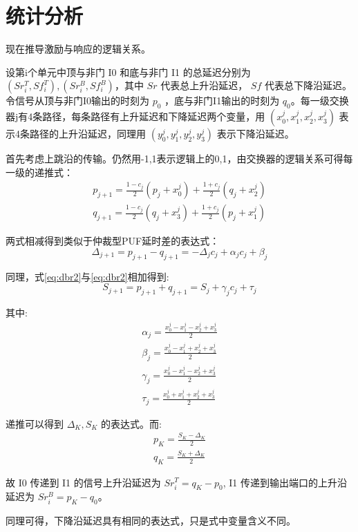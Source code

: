 \section{统计分析}\label{sec:dbrpuf_stat}
现在推导激励与响应的逻辑关系。

设第i个单元中顶与非门 I0 和底与非门 I1 的总延迟分别为 $ (Sr_i^T,Sf_i^T),(Sr_i^B,Sf_i^B) $，其中 $ Sr $ 代表总上升沿延迟， $ Sf $ 代表总下降沿延迟。
令信号从顶与非门I0输出的时刻为 $ p_0 $ ，底与非门I1输出的时刻为 $ q_0 $。每一级交换器j有4条路径，每条路径有上升延迟和下降延迟两个变量，用 $ (x_0^j,x_1^j,x_2^j,x_3^j) $ 表示4条路径的上升沿延迟，同理用 $ (y_0^j,y_1^j,y_2^j,y_3^j) $ 表示下降沿延迟。

首先考虑上跳沿的传输。仍然用{-1,1}表示逻辑上的{0,1}，由交换器的逻辑关系可得每一级的递推式：
\begin{eqnarray}
\label{eq:dbr1}
p_{j+1}=\frac{1-c_j}{2}(p_j+x_0^j)+\frac{1+c_j}{2}(q_j+x_2^j) \\
\label{eq:dbr2}
q_{j+1}=\frac{1-c_j}{2}(q_j+x_3^j)+\frac{1+c_j}{2}(p_j+x_1^j)
\end{eqnarray}

两式相减得到类似于仲裁型PUF延时差的表达式：
\begin{equation}
\Delta_{j+1}=p_{j+1}-q_{j+1}=-\Delta_jc_j+\alpha_jc_j+\beta_j
\end{equation}

同理，式\ref{eq:dbr2}与\ref{eq:dbr2}相加得到:
\begin{equation}
S_{j+1}=p_{j+1}+q_{j+1}=S_j+\gamma_jc_j+\tau_j
\end{equation}

其中:
\begin{eqnarray}
\alpha_j=\frac{x_0^j-x_1^j-x_2^j+x_3^j}{2} \nonumber\\
\beta_j=\frac{x_0^j-x_1^j+x_2^j+x_3^j}{2} \nonumber\\
\gamma_j=\frac{x_0^j-x_1^j-x_2^j+x_3^j}{2} \nonumber\\
\tau_j=\frac{x_0^j+x_1^j+x_2^j+x_3^j}{2} \nonumber
\end{eqnarray}

递推可以得到 $ \Delta_K, S_K $ 的表达式。而:
\begin{eqnarray}
p_K=\frac{S_K-\Delta_K}{2} \\
q_K=\frac{S_K+\Delta_K}{2}
\end{eqnarray}

故 I0 传递到 I1 的信号上升沿延迟为 $ Sr_i^T=q_K-p_0 $, I1 传递到输出端口的上升沿延迟为 $ Sr_i^B=p_K-q_0 $。

同理可得，下降沿延迟具有相同的表达式，只是式中变量含义不同。

